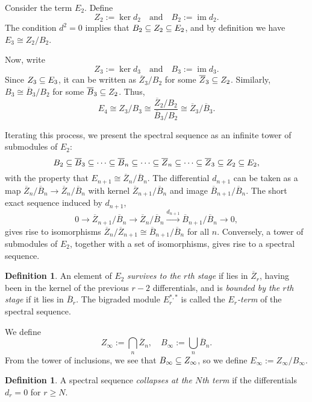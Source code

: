 \documentclass[11pt, titlepage]{article} %
\def\subq{\ensuremath\subseteq}
\DeclareMathOperator{\im}{im}
\numberwithin{equation}{subsection}
\theoremstyle{plain}
\theoremstyle{definition}
\newtheorem{definition}[theorem]{Definition}
\begin{document}
Consider the term \(E_2\). Define 
\[Z_2:=\ker d_2 \quad \text{and} \quad B_2:=\im d_2.\]
The condition \(d^2=0\) implies that \(B_2\subq Z_2\subq E_2\), and by definition we have \(E_3\cong Z_2/B_2\). 

Now, write 
\[Z_3:=\ker d_3 \quad \text{and} \quad B_3:=\im d_3.\]
Since \(Z_3\subq E_3\), it can be written as \(\overline{Z}_3/B_2\) for some \(\overline{Z}_3\subq Z_2\). Similarly, \(B_3\cong \overline B_3/B_2\) for some \(\overline B_3\subq Z_2\). Thus,
\[E_4\cong Z_3/B_3\cong \frac{\overline Z_2/B_2}{\overline B_3/B_2}\cong \overline Z_3/\overline B_3.\]

Iterating this process, we present the spectral sequence as an infinite tower of submodules of \(E_2\):
\[B_2\subq \overline B_3\subq \cdots \subq \overline B_n\subq \cdots \subq \overline Z_n\subq \cdots \subq \overline Z_3\subq Z_2\subq E_2,\]
with the property that \(E_{n+1}\cong \overline Z_n/\overline B_n\). The differential \(d_{n+1}\) can be taken as a map \(\overline Z_n/\overline B_n\to\overline Z_n/\overline B_n\) with kernel \(\overline Z_{n+1}/\overline B_n\) and image \(\overline B_{n+1}/\overline B_n\). The short exact sequence induced by \(d_{n+1}\),
\[0 \to \overline Z_{n+1}/\overline B_n\to \overline Z_n/\overline B_n \xrightarrow{d_{n+1}} \overline B_{n+1}/\overline{B}_n\to 0,\]
gives rise to isomorphisms \(\overline{Z}_n/\overline{Z}_{n+1}\cong \overline{B}_{n+1}/\overline{B}_n\) for all \(n\). Conversely, a tower of submodules of \(E_2\), together with a set of isomorphisms, gives rise to a spectral sequence. 

\begin{definition}
An element of \(E_2\) \textit{survives to the \(r\)th stage} if lies in \(\overline{Z}_r\), having been in the kernel of the previous \(r-2\) differentials, and is \textit{bounded by the \(r\)th stage} if it lies in \(\overline{B}_r\). The bigraded module \(E_r^{*,*}\) is called the \textit{\(E_r\)-term} of the spectral sequence. 
\end{definition}

We define 
\[Z_\infty:= \bigcap_n \overline{Z}_n, \quad B_\infty:=\bigcup_n \overline{B}_n.\]
From the tower of inclusions, we see that \(B_\infty\subq Z_\infty\), so we define \(E_\infty:=Z_\infty/B_\infty\). 

\begin{definition}
A spectral sequence \textit{collapses at the \(N\)th term} if the differentials \(d_r=0\) for \(r\geq N\). 
\end{definition}
\end{document}
